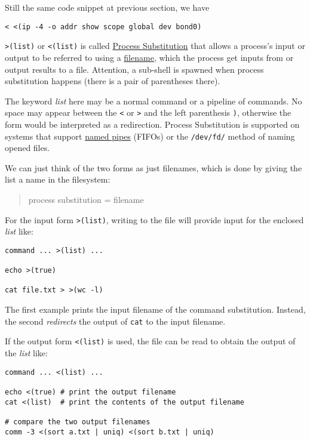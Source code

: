 Still the same code snippet at previous section, we have

\begin{lstlisting}
< <(ip -4 -o addr show scope global dev bond0)
\end{lstlisting}

\lstinline|>(list)| or \lstinline|<(list)| is called
\href{https://www.gnu.org/software/bash/manual/bash.html#Process-Substitution}{Process
  Substitution} that allows a process's input or output to be
referred to using a \uline{filename}, which the process get inputs
from or output results to a file. Attention, a sub-shell is
spawned when process substitution happens (there is a pair of
parentheses there).

The keyword \textit{list} here may be a normal command or a
pipeline of commands. No space may appear between the \verb|<| or
\verb|>| and the left parenthesis \verb|)|, otherwise the form
would be interpreted as a redirection. Process Substitution is
supported on systems that support
\href{http://mywiki.wooledge.org/NamedPipes}{named pipes} (FIFOs)
or the \verb|/dev/fd/| method of naming opened files.

We can just think of the two forms as just filenames, which is
done by giving the list a name in the filesystem:

\begin{quotation}
  process substitution = filename
\end{quotation}

For the input form \lstinline|>(list)|, writing to the file will
provide input for the enclosed \textit{list} like:

\begin{lstlisting}
command ... >(list) ...

echo >(true)

cat file.txt > >(wc -l)
\end{lstlisting}

The first example prints the input filename of the command
substitution. Instead, the second \textit{redirects} the output of
\lstinline|cat| to the input filename.

If the output form
\lstinline|<(list)| is used, the file can be read to obtain the
output of the \textit{list} like:

\begin{minipage}{1.0\linewidth}
\begin{lstlisting}
command ... <(list) ...

echo <(true) # print the output filename
cat <(list)  # print the contents of the output filename

# compare the two output filenames
comm -3 <(sort a.txt | uniq) <(sort b.txt | uniq)
\end{lstlisting}
\end{minipage}

